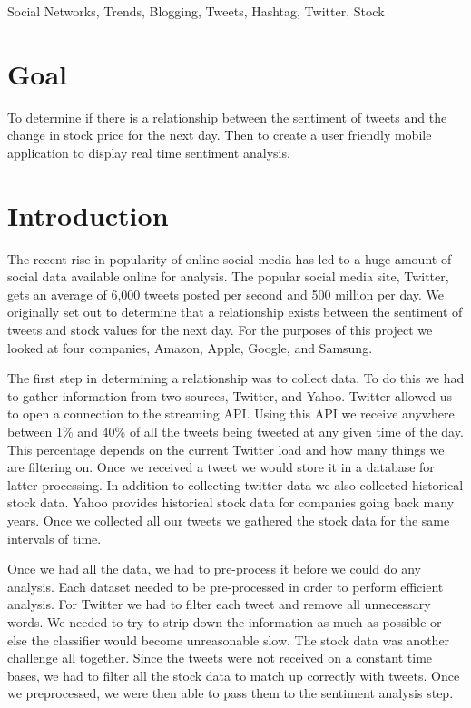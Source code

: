 \documentclass{acm_proc_article-sp}
\begin{document}
Social Networks, Trends, Blogging, Tweets, Hashtag, Twitter, Stock

\section*{Goal}

To determine if there is a relationship between the sentiment of tweets and the
change in stock price for the next day. Then to create a user friendly mobile
application to display real time sentiment analysis.

\section{Introduction}

The recent rise in popularity of online social media has led to a huge amount
of social data available online for analysis. The popular social media site,
Twitter, gets an average of 6,000 tweets posted per second and 500 million per
day. We originally set out to determine that a relationship exists between the
sentiment of tweets and stock values for the next day. For the purposes of
this project we looked at four companies, Amazon, Apple, Google, and Samsung. 

The first step in determining a relationship was to collect data. To do this we had to gather information
from two sources, Twitter, and Yahoo. Twitter allowed us to open a connection
to the streaming API. Using this API we receive anywhere between 1\% and 40\%
of all the tweets being tweeted at any given time of the day. This percentage depends on the current Twitter
load and how many things we are filtering on. Once we received a tweet we would
store it in a database for latter processing.  In addition to collecting
twitter data we also collected historical stock data. Yahoo provides historical
stock data for companies going back many years. Once we collected all our
tweets we gathered the stock data for the same intervals of time.

Once we had all the data, we had to pre-process it before we could do any
analysis. Each dataset needed to be pre-processed in order to perform
efficient analysis. For Twitter we had to filter each tweet and
remove all unnecessary words. We needed to try to strip down the information
as much as possible or else the classifier would become unreasonable slow. The
stock data was another challenge all together. Since the tweets were not
received on a constant time bases, we had to filter all the stock data to match
up correctly with tweets. Once we preprocessed, we were then able to pass them to
the sentiment analysis step.
\end{document}
